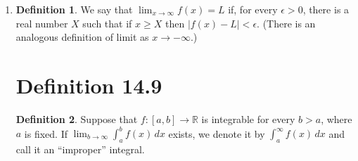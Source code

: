 \documentclass[openany, amssymb, psamsfonts]{amsart}
\newcommand{\bbR}{\mathbb{R}}
\newcommand{\abs}[1]{\lvert #1 \rvert}
\theoremstyle{definition}
\newtheorem{defn}{Definition}[section]
\numberwithin{equation}{section}
\begin{document}
\begin{enumerate}
\section*{Definition 14.8: Infinite Limits}
\item
\begin{defn}
\label{14.8}
	We say that $\displaystyle \lim_{x \to \infty} f(x)=L$ if, for every $\epsilon>0$, there is a real number $X$ such that if
	$x\geq X$ then  $\abs{f(x)-L}<\epsilon$. (There is an analogous definition of limit as $x\to -\infty$.)
\end{defn}

\section*{Definition 14.9}
\begin{defn}
\label{14.9}
	Suppose that $f\colon [a,b]\to \bbR$ is integrable for every $b>a$, where $a$ is fixed. If $\displaystyle \lim_{b\to \infty} \int_a^b f(x)\,dx$ exists, we denote it by $\displaystyle \int_a^\infty f(x)\,dx$ and call it
	an ``improper'' integral.
\end{defn}


\end{enumerate}
\end{document}
